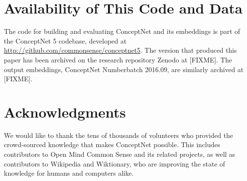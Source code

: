 \documentclass[letterpaper]{article}
\begin{document}
\section{Availability of This Code and Data}


The code for building and evaluating ConceptNet and its embeddings is part of
the ConceptNet 5 codebase, developed at \url{http://github.com/commonsense/conceptnet5}.
The version that produced this paper has been archived on the research repository
Zenodo at [FIXME]. The output embeddings, ConceptNet Numberbatch 2016.09, are similarly
archived at [FIXME].

\section{Acknowledgments}

We would like to thank the tens of thousands of volunteers who provided the
crowd-sourced knowledge that makes ConceptNet possible. This includes
contributors to Open Mind Common Sense and its related projects, as well as
contributors to Wikipedia and Wiktionary, who are improving the state of
knowledge for humans and computers alike.



\end{document}
